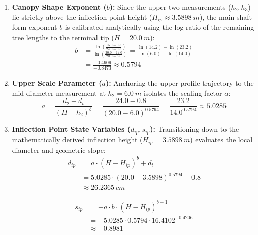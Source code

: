 \documentclass[twocolumn, bibliography=totoc]{scrartcl}
\begin{document}
\begin{enumerate}
\item \textbf{Canopy Shape Exponent ($b$):} Since the upper two measurements ($h_2, h_3$) lie strictly above the inflection point height ($H_{ip} \approx \qty{3.5898}{m}$), the main-shaft form exponent $b$ is calibrated analytically using the log-ratio of the remaining tree lengths to the terminal tip ($H = \qty{20.0}{m}$):
  \begin{equation}
\begin{aligned}
    b &= \frac{\ln\left(\frac{15.0 - 0.8}{24.0 - 0.8}\right)}{\ln\left(\frac{20.0 - 14.0}{20.0 - 6.0}\right)} = \frac{\ln(14.2) - \ln(23.2)}{\ln(6.0) - \ln(14.0)} \\
    &= \frac{-0.4909}{-0.8473} \approx 0.5794
\end{aligned}
\end{equation}

    \item \textbf{Upper Scale Parameter ($a$):} Anchoring the upper profile trajectory to the mid-diameter measurement at $h_2 = \qty{6.0}{m}$ isolates the scaling factor $a$:
    \begin{equation}
        a = \frac{d_2 - d_t}{(H - h_2)^b} = \frac{24.0 - 0.8}{(20.0 - 6.0)^{0.5794}} = \frac{23.2}{14.0^{0.5794}} \approx 5.0285
    \end{equation}

  \item \textbf{Inflection Point State Variables ($d_{ip}, s_{ip}$):} Transitioning down to the mathematically derived inflection height ($H_{ip} = \qty{3.5898}{m}$) evaluates the local diameter and geometric slope:
    \begin{equation}
\begin{aligned}
    d_{ip} &= a \cdot (H - H_{ip})^b + d_t \\
    &= 5.0285 \cdot (20.0 - 3.5898)^{0.5794} + 0.8 \\
    &\approx \qty{26.2365}{cm}
\end{aligned}
\end{equation}

\begin{equation}
\begin{aligned}
    s_{ip} &= -a \cdot b \cdot (H - H_{ip})^{b-1} \\
    &= -5.0285 \cdot 0.5794 \cdot 16.4102^{-0.4206} \\
    &\approx -0.8981
\end{aligned}
\end{equation}


\end{enumerate}
\end{document}

